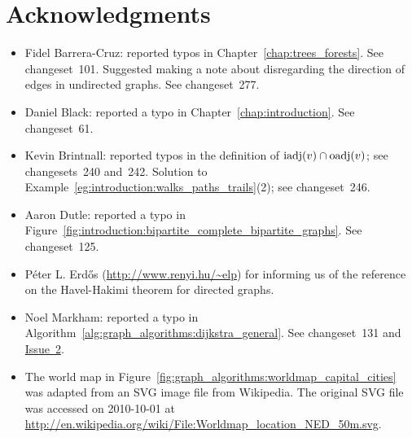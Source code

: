 
\chapter{Acknowledgments}

\begin{itemize}
\item Fidel Barrera-Cruz: reported typos in
  Chapter~\ref{chap:trees_forests}. See changeset~101. Suggested
  making a note about disregarding the direction of edges in
  undirected graphs. See changeset~277.

\item Daniel Black: reported a typo in
  Chapter~\ref{chap:introduction}. See changeset~61.

\item Kevin Brintnall: reported typos in the definition of
  $\operatorname*{iadj}(v) \cap \operatorname*{oadj}(v)$; see changesets~240 and~242. Solution to
  Example~\ref{eg:introduction:walks_paths_trails}(2); see changeset~246.

\item Aaron Dutle: reported a typo in
  Figure~\ref{fig:introduction:bipartite_complete_bipartite_graphs}. See
  changeset~125.

\item P\'eter L. Erd\H{o}s (\url{http://www.renyi.hu/~elp}) for informing
  us of the reference~\cite{ErdosEtAl2010} on the Havel-Hakimi
  theorem for directed graphs.

\item Noel Markham: reported a typo in
  Algorithm~\ref{alg:graph_algorithms:dijkstra_general}. See
  changeset~131 and
  \href{http://code.google.com/p/graph-theory-algorithms-book/issues/detail?id=2}{Issue~2}.

\item The world map in
  Figure~\ref{fig:graph_algorithms:worldmap_capital_cities} was
  adapted from an SVG image file from Wikipedia. The original SVG file
  was accessed on 2010-10-01 at
  \url{http://en.wikipedia.org/wiki/File:Worldmap_location_NED_50m.svg}.
\end{itemize}
